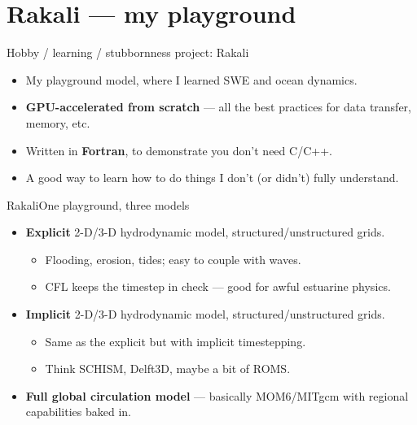 \documentclass[aspectratio=169]{beamer}
\begin{document}
\section{Rakali --- my playground}

\begin{frame}{Hobby / learning / stubbornness project: Rakali}
  \begin{itemize}\setlength\itemsep{4pt}
    \item My playground model, where I learned SWE and ocean dynamics.
    \item \textbf{GPU-accelerated from scratch} --- all the best practices for data transfer, memory, etc.
    \item Written in \textbf{Fortran}, to demonstrate you don't need C/C++.
    \item A good way to learn how to do things I don't (or didn't) fully understand.
  \end{itemize}
\end{frame}

\begin{frame}{Rakali}{One playground, three models}
  \begin{itemize}
    \item \textbf{Explicit} 2-D/3-D hydrodynamic model, structured/unstructured grids.
      \begin{itemize}
        \item Flooding, erosion, tides; easy to couple with waves.
        \item CFL keeps the timestep in check --- good for awful estuarine physics.
      \end{itemize}
    \item \textbf{Implicit} 2-D/3-D hydrodynamic model, structured/unstructured grids.
      \begin{itemize}
        \item Same as the explicit but with implicit timestepping.
        \item Think SCHISM, Delft3D, maybe a bit of ROMS.
      \end{itemize}
    \item \textbf{Full global circulation model} --- basically MOM6/MITgcm with regional capabilities baked in.
  \end{itemize}
\end{frame}
\end{document}

